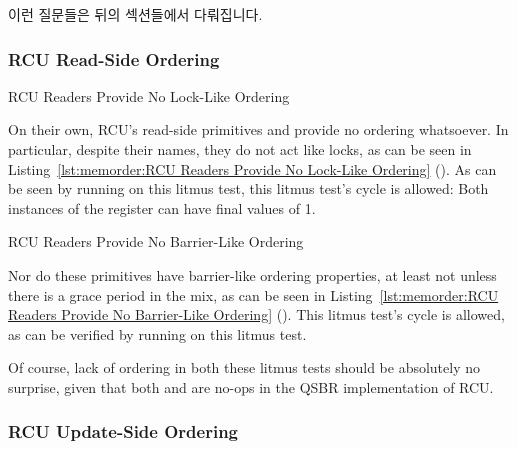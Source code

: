 이런 질문들은 뒤의 섹션들에서 다뤄집니다.

\subsubsection{RCU Read-Side Ordering}
\label{sec:memorder:RCU Read-Side Ordering}

\begin{listing}[tb]

\caption{RCU Readers Provide No Lock-Like Ordering}
\label{lst:memorder:RCU Readers Provide No Lock-Like Ordering}
\end{listing}

On their own, RCU's read-side primitives  and
 provide no ordering whatsoever.
In particular, despite their names, they do not act like locks, as can
be seen in
Listing~\ref{lst:memorder:RCU Readers Provide No Lock-Like Ordering}
().
As can be seen by running  on this litmus test, this litmus
test's cycle is allowed: Both instances of the  register can
have final values of 1.

\begin{listing}[tb]

\caption{RCU Readers Provide No Barrier-Like Ordering}
\label{lst:memorder:RCU Readers Provide No Barrier-Like Ordering}
\end{listing}

Nor do these primitives have barrier-like ordering properties,
at least not unless there is a grace period in the mix, as can be seen in
Listing~\ref{lst:memorder:RCU Readers Provide No Barrier-Like Ordering}
().
This litmus test's cycle is allowed, as can be verified by running
 on this litmus test.

Of course, lack of ordering in both these litmus tests should be absolutely
no surprise, given that both  and 
are no-ops in the QSBR implementation of RCU.

\subsubsection{RCU Update-Side Ordering}
\label{sec:memorder:RCU Update-Side Ordering}

